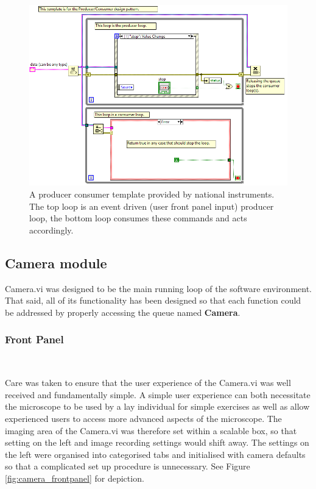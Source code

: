\begin{figure}
\centering
\includegraphics[width=0.8\linewidth]{Figures/standard_pro_cons}
\caption[LabVIEW Producer Consumer Template]{A producer consumer template provided by national instruments.
The top loop is an event driven (user front panel input) producer loop, the bottom loop consumes these commands and acts accordingly.}
\label{fig:standard_pro_cons}
\end{figure}


\subsection{Camera module}

Camera.vi was designed to be the main running loop of the software environment.
That said, all of its functionality has been designed so that each function could be addressed by properly accessing the queue named \textbf{Camera}.

\subsubsection{Front Panel}~

Care was taken to ensure that the user experience of the Camera.vi was well received and fundamentally simple.
A simple user experience can both necessitate the microscope to be used by a lay individual for simple exercises as well as allow experienced users to access more advanced aspects of the microscope.
The imaging area of the Camera.vi was therefore set within a scalable box, so that setting on the left and image recording settings would shift away.
The settings on the left were organised into categorised tabs and initialised with camera defaults so that a complicated set up procedure is unnecessary.
See Figure \ref{fig:camera_frontpanel} for depiction.


